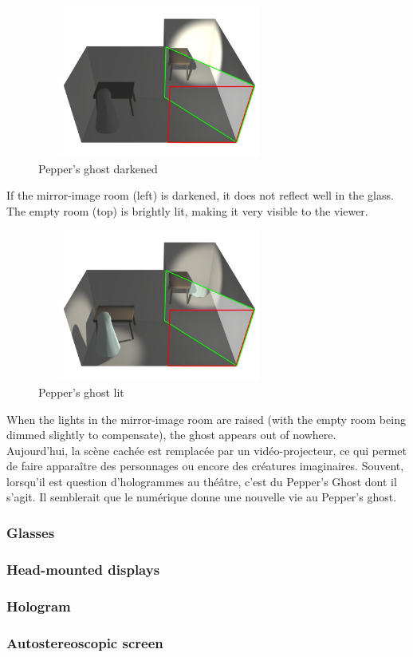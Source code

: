 \clearpage

\begin{figure}[h!]
\centering\includegraphics[width=8cm,height=5cm]{image/Peppers2.jpg}
\caption{Pepper's ghost darkened\cite{Peppers-ghost}}
\label{fig:paraba}
\end{figure}
If the mirror-image room (left) is darkened, it does not reflect well in the glass. The empty room (top) is brightly lit, making it very visible to the viewer.\cite{Peppers-ghost}

\begin{figure}[h!]
\centering\includegraphics[width=8cm,height=5cm]{image/Peppers3.jpg}
\caption{Pepper's ghost lit\cite{Peppers-ghost}}
\label{fig:paraba}
\end{figure}

When the lights in the mirror-image room are raised (with the empty room being dimmed slightly to compensate), the ghost appears out of nowhere.\cite{Peppers-ghost}\\

Aujourd’hui, la scène cachée est remplacée par un vidéo-projecteur, ce qui permet de faire apparaître des personnages ou encore des créatures imaginaires. Souvent, lorsqu’il est question d’hologrammes au théâtre, c’est du Pepper’s Ghost dont il s’agit. Il semblerait que le numérique donne une nouvelle vie au Pepper’s ghost.


\subsubsection{Glasses}
\subsubsection{Head-mounted displays}
\subsubsection{Hologram}
\subsubsection{Autostereoscopic screen}
